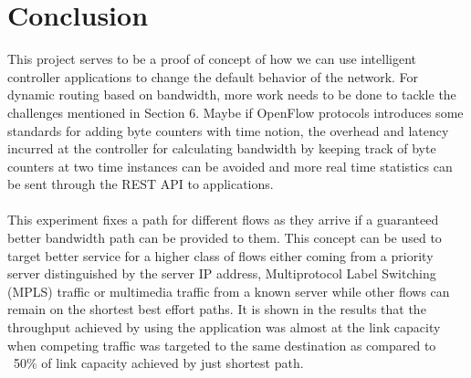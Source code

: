 \documentclass[paper=a4, fontsize=12pt]{scrartcl}	%
\numberwithin{equation}{section}		%
\numberwithin{figure}{section}			%
\numberwithin{table}{section}				%
\begin{document}
\section{Conclusion}
This project serves to be a proof of concept of how we can use intelligent controller applications to change the default behavior of the network. For dynamic routing based on bandwidth, more work needs to be done to tackle the challenges mentioned in Section 6. Maybe if OpenFlow protocols introduces some standards for adding byte counters with time notion, the overhead and latency incurred at the controller for calculating bandwidth by keeping track of byte counters at two time instances can be avoided and more real time statistics can be sent through the REST API to applications.
\\
\\
This experiment fixes a path for different flows as they arrive if a guaranteed better bandwidth path can be provided to them. This concept can be used to target better service for a higher class of flows either coming from a priority server distinguished by the server IP address, Multiprotocol Label Switching (MPLS) traffic or multimedia traffic from a known server while other flows can remain on the shortest best effort paths. It is shown in the results that the throughput achieved by using the application was almost at the link capacity when competing traffic was targeted to the same destination as compared to ~50\% of link capacity achieved by just shortest path.
\end{document}
